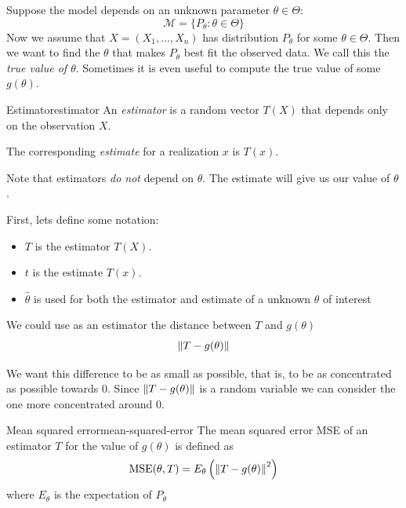 \documentclass[12pt]{extarticle}
\begin{document}
Suppose the model depends on an unknown parameter $\theta \in \Theta$:
\begin{equation}
    \mathcal M = \{ P_\theta : \theta \in \Theta \}
\end{equation}
Now we assume that $X = (X_1, \dots, X_n)$ has distribution $P_\theta$ for some $\theta \in \Theta$.
Then we want to find the $\theta$ that makes $P_\theta$ best fit the observed data.
We call this the \emph{true value of $\theta$}.
Sometimes it is even useful to compute the true value of some $g(\theta)$.

\begin{definition}{Estimator}{estimator}
    An \emph{estimator} is a random vector $T(X)$ that depends only on the observation $X$.

    The corresponding \emph{estimate} for a realization $x$ is $T(x)$.
\end{definition}

Note that estimators \emph{do not} depend on $\theta$.
The estimate will give us our value of $\theta$.

First, lets define some notation:
\begin{itemize}
    \item $T$ is the estimator $T(X)$.
    \item $t$ is the estimate $T(x)$.
    \item $\hat \theta$ is used for both the estimator and estimate of a unknown $\theta$ of interest
\end{itemize}

We could use as an estimator the distance between $T$ and $g(\theta)$
\begin{equation}
    \norm{T - g(\theta)}
\end{equation}

We want this difference to be as small as possible, that is, to be as concentrated as possible towards $0$.
Since $\norm{T - g(\theta)}$ is a random variable we can consider the one more concentrated around $0$.

\newcommand{\MSE}{{\operatorfont MSE}}

\begin{definition}{Mean squared error}{mean-squared-error}
    The mean squared error MSE of an estimator $T$ for the value of $g(\theta)$ is defined as
    \begin{equation}
        \MSE(\theta, T) = E_\theta\left(\norm{T - g(\theta)}^2\right)
    \end{equation}
    where $E_\theta$ is the expectation of $P_\theta$
\end{definition}
\end{document}
